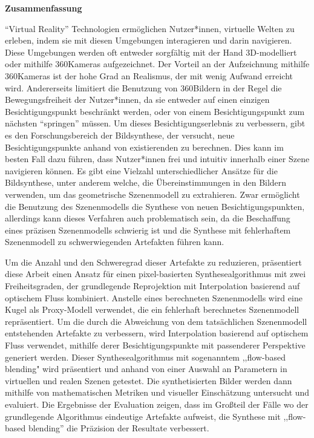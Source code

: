 \vspace*{2cm}

\begin{center}
    \textbf{Zusammenfassung}
\end{center}

\vspace*{1cm}

\noindent 
``Virtual Reality'' Technologien ermöglichen Nutzer*innen, virtuelle Welten zu erleben, indem sie mit diesen Umgebungen interagieren und darin navigieren. Diese Umgebungen werden oft entweder sorgf\"altig mit der Hand 3D-modelliert oder mithilfe 360\degree Kameras aufgezeichnet.
Der Vorteil an der Aufzeichnung mithilfe 360\degree Kameras ist der hohe Grad an Realismus, der mit wenig Aufwand erreicht wird. Andererseits limitiert die Benutzung von 360\degree Bildern in der Regel die Bewegungsfreiheit der Nutzer*innen, da sie entweder auf einen einzigen Besichtigungspunkt beschr\"ankt werden, oder von einem Besichtigungspunkt zum n\"achsten ``springen'' müssen.
Um dieses Besichtigungserlebnis zu verbessern, gibt es den Forschungsbereich der Bildsynthese, der versucht, neue Besichtigungspunkte anhand von existierenden zu berechnen. Dies kann im besten Fall dazu f\"uhren, dass Nutzer*innen frei und intuitiv innerhalb einer Szene navigieren k\"onnen.
Es gibt eine Vielzahl unterschiedlicher Ans\"atze f\"ur die Bildsynthese, unter anderem welche, die \"Ubereinstimmungen in den Bildern verwenden, um das geometrische Szenenmodell zu extrahieren. Zwar erm\"oglicht die Benutzung des Szenenmodells die Synthese von neuen Besichtigungspunkten, allerdings kann dieses Verfahren auch problematisch sein, da die Beschaffung eines pr\"azisen Szenenmodells schwierig ist und die Synthese mit fehlerhaftem Szenenmodell zu schwerwiegenden Artefakten f\"uhren kann.

Um die Anzahl und den Schweregrad dieser Artefakte zu reduzieren, pr\"asentiert diese Arbeit einen Ansatz f\"ur einen pixel-basierten Synthesealgorithmus mit zwei Freiheitsgraden, der grundlegende Reprojektion mit Interpolation basierend auf optischem Fluss kombiniert. Anstelle eines berechneten Szenenmodells wird eine Kugel als Proxy-Modell verwendet, die ein fehlerhaft berechnetes Szenenmodell repr\"asentiert. Um die durch die Abweichung von dem tats\"achlichen Szenenmodell entstehenden Artefakte zu verbessern, wird Interpolation basierend auf optischem Fluss verwendet, mithilfe derer Besichtigungspunkte mit passenderer Perspektive generiert werden. Dieser Synthesealgorithmus mit sogenanntem ,,flow-based blending" wird pr\"asentiert und anhand von einer Auswahl an Parametern in virtuellen und realen Szenen getestet. Die synthetisierten Bilder werden dann mithilfe von mathematischen Metriken und visueller Einsch\"atzung untersucht und evaluiert. Die Ergebnisse der Evaluation zeigen, dass im Gro{\ss}teil der F\"alle wo der grundlegende Algorithmus eindeutige Artefakte aufweist, die Synthese mit ,,flow-based blending'' die Pr\"azision der Resultate verbessert.

